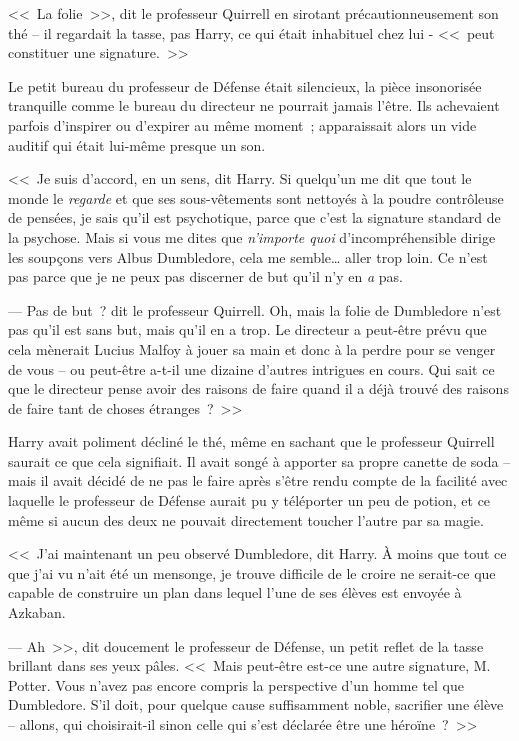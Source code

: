 <<~La folie~>>, dit le professeur Quirrell en sirotant précautionneusement son thé -- il regardait la tasse, pas Harry, ce qui était inhabituel chez lui - <<~peut constituer une signature.~>>

Le petit bureau du professeur de Défense était silencieux, la pièce insonorisée tranquille comme le bureau du directeur ne pourrait jamais l'être. Ils achevaient parfois d'inspirer ou d'expirer au même moment~; apparaissait alors un vide auditif qui était lui-même presque un son.

<<~Je suis d'accord, en un sens, dit Harry. Si quelqu'un me dit que tout le monde le \emph{regarde} et que ses sous-vêtements sont nettoyés à la poudre contrôleuse de pensées, je sais qu'il est psychotique, parce que c'est la signature standard de la psychose. Mais si vous me dites que \emph{n'importe quoi} d'incompréhensible dirige les soupçons vers Albus Dumbledore, cela me semble… aller trop loin. Ce n'est pas parce que je ne peux pas discerner de but qu'il n'y en \emph{a} pas.

--- Pas de but~? dit le professeur Quirrell. Oh, mais la folie de Dumbledore n'est pas qu'il est sans but, mais qu'il en a trop. Le directeur a peut-être prévu que cela mènerait Lucius Malfoy à jouer sa main et donc à la perdre pour se venger de vous -- ou peut-être a-t-il une dizaine d'autres intrigues en cours. Qui sait ce que le directeur pense avoir des raisons de faire quand il a déjà trouvé des raisons de faire tant de choses étranges~?~>>

Harry avait poliment décliné le thé, même en sachant que le professeur Quirrell saurait ce que cela signifiait. Il avait songé à apporter sa propre canette de soda -- mais il avait décidé de ne pas le faire après s'être rendu compte de la facilité avec laquelle le professeur de Défense aurait pu y téléporter un peu de potion, et ce même si aucun des deux ne pouvait directement toucher l'autre par sa magie.

<<~J'ai maintenant un peu observé Dumbledore, dit Harry. À moins que tout ce que j'ai vu n'ait été un mensonge, je trouve difficile de le croire ne serait-ce que capable de construire un plan dans lequel l'une de ses élèves est envoyée à Azkaban.

--- Ah~>>, dit doucement le professeur de Défense, un petit reflet de la tasse brillant dans ses yeux pâles. <<~Mais peut-être est-ce une autre signature, M. Potter. Vous n'avez pas encore compris la perspective d'un homme tel que Dumbledore. S'il doit, pour quelque cause suffisamment noble, sacrifier une élève -- allons, qui choisirait-il sinon celle qui s'est déclarée être une héroïne~?~>>

